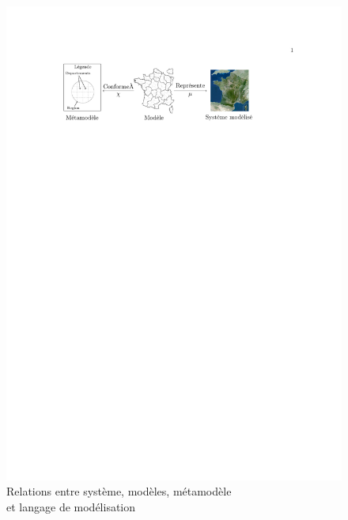 \begin{figure}[!ht]
    \centering
    \includegraphics[trim=100 635 150 100, clip]{figures/3_etat_de_l_art_IDM/metamodel_carte.pdf} %
 \caption{Relations entre système, modèles, métamodèle \\
 et langage de modélisation~\protect\cite{favre2006ingenierie}}
 \label{fig:carteFavre}
\end{figure}


